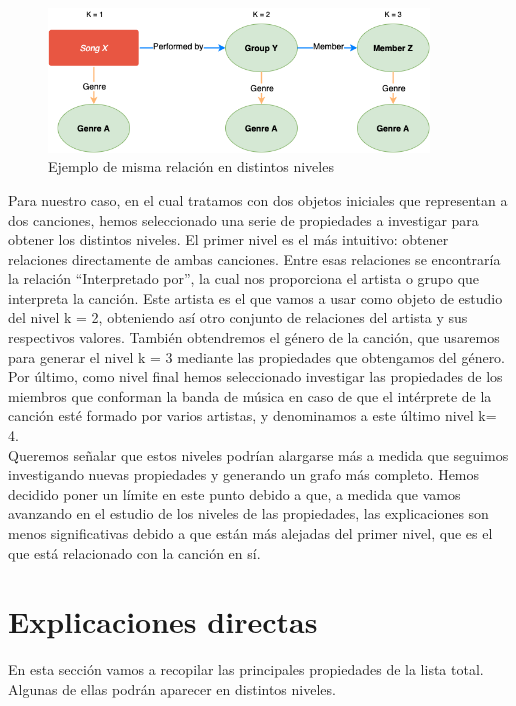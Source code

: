 \begin{figure}[h!]
	\centering
	\includegraphics[width = 0.9\textwidth]{Imagenes/Bitmap/RelationLevels.png}
	\caption{Ejemplo de misma relación en distintos niveles}
	\label{fig:sampleImage}
\end{figure}

Para nuestro caso, en el cual tratamos con dos objetos iniciales que representan a dos canciones, hemos seleccionado una serie de propiedades a investigar para obtener los distintos niveles. El primer nivel es el más intuitivo: obtener relaciones directamente de ambas canciones. Entre esas relaciones se encontraría la relación ``Interpretado por'', la cual nos proporciona el artista o grupo que interpreta la canción. Este artista es el que vamos a usar como objeto de estudio del nivel k = 2, obteniendo así otro conjunto de relaciones del artista y sus respectivos valores. También obtendremos el género de la canción, que usaremos para generar el nivel k = 3 mediante las propiedades que obtengamos del género. Por último, como nivel final hemos seleccionado investigar las propiedades de los miembros que conforman la banda de música en caso de que el intérprete de la canción esté formado por varios artistas, y denominamos a este último nivel k= 4.\\

Queremos señalar que estos niveles podrían alargarse más a medida que seguimos investigando nuevas propiedades y generando un grafo más completo. Hemos decidido poner un límite en este punto debido a que, a medida que vamos avanzando en el estudio de los niveles de las propiedades, las explicaciones son menos significativas debido a que están más alejadas del primer nivel, que es el que está relacionado con la canción en sí.\\

\section{Explicaciones directas}

En esta sección vamos a recopilar las principales propiedades de la lista total. Algunas de ellas podrán aparecer en distintos niveles.


